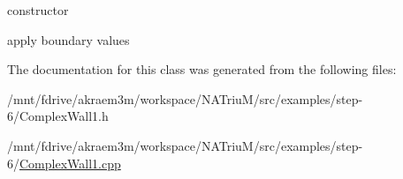 constructor 

apply boundary values 

The documentation for this class was generated from the following files:\begin{DoxyCompactItemize}
\item 
/mnt/fdrive/akraem3m/workspace/NATriuM/src/examples/step-\/6/ComplexWall1.h\item 
/mnt/fdrive/akraem3m/workspace/NATriuM/src/examples/step-\/6/\hyperlink{ComplexWall1_8cpp}{ComplexWall1.cpp}\end{DoxyCompactItemize}
